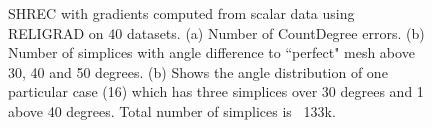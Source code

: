 \begin{figure}[p]
	\caption{SHREC with gradients computed from scalar data using RELIGRAD on 40 datasets. (a) Number of CountDegree errors. (b) Number of simplices with angle difference to ``perfect" mesh above 30, 40 and 50 degrees. (b) Shows the angle distribution of one particular case (16) which has three simplices over 30 degrees and 1 above 40 degrees. Total number of simplices is ~133k.}\label{fig:flangeAngle}
\end{figure}

